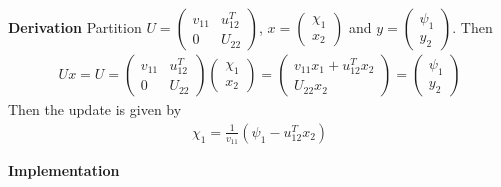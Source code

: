 \documentclass[11pt,a4paper]{article}
\begin{document}
\section{}
{\bf Derivation}
Partition 
$U=\left(\begin{array}{c|c} v_{11}& u_{12}^T \\\hline 0 & U_{22} \end{array}\right)$,
$x = \left( \begin{array}{c} \chi_1 \\\hline x_2 \end{array} \right)$ and 
$y = \left( \begin{array}{c} \psi_1 \\\hline y_2 \end{array} \right)$. Then
\begin{align}
    Ux = 
    U=\left(\begin{array}{c|c} v_{11}& u_{12}^T \\\hline 0 & U_{22} \end{array}\right)
    \left( \begin{array}{c} \chi_1 \\\hline x_2 \end{array} \right) 
    = 
    \left( \begin{array}{c} v_{11}x_1 + u_{12}^T x_2 \\\hline U_{22} x_2 \end{array} \right) 
    =
    \left( \begin{array}{c} \psi_1 \\\hline y_2 \end{array} \right)
\end{align}
Then the update is given by
\begin{align}
    \chi_1 = \frac{1}{v_{11}}(\psi_1 - u_{12}^T x_2)
\end{align}


\noindent
{\bf Implementation}


\newpage
\setcounter{section}{14}
\end{document}
